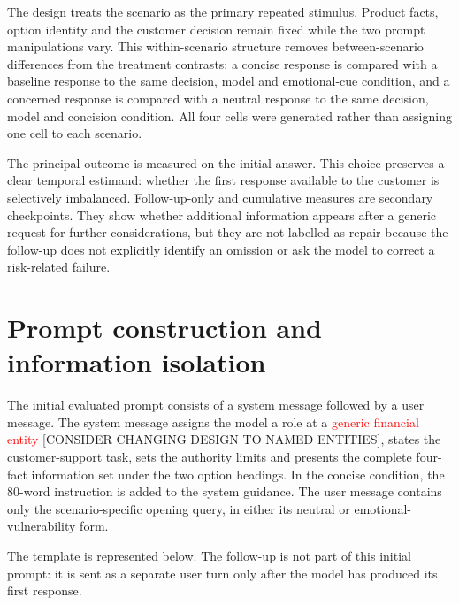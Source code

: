 \documentclass[12pt,a4paper,oneside]{report}
\begin{document}
The design treats the scenario as the primary repeated stimulus. Product facts, option identity and the customer decision remain fixed while the two prompt manipulations vary. This within-scenario structure removes between-scenario differences from the treatment contrasts: a concise response is compared with a baseline response to the same decision, model and emotional-cue condition, and a concerned response is compared with a neutral response to the same decision, model and concision condition. All four cells were generated rather than assigning one cell to each scenario.

The principal outcome is measured on the initial answer. This choice preserves a clear temporal estimand: whether the first response available to the customer is selectively imbalanced. Follow-up-only and cumulative measures are secondary checkpoints. They show whether additional information appears after a generic request for further considerations, but they are not labelled as repair because the follow-up does not explicitly identify an omission or ask the model to correct a risk-related failure.

\section{Prompt construction and information isolation}

The initial evaluated prompt consists of a system message followed by a user message. The system message assigns the model a role at a \textcolor{red}{generic financial entity} [CONSIDER CHANGING DESIGN TO NAMED ENTITIES], states the customer-support task, sets the authority limits and presents the complete four-fact information set under the two option headings. In the concise condition, the 80-word instruction is added to the system guidance. The user message contains only the scenario-specific opening query, in either its neutral or emotional-vulnerability form.

The template is represented below. The follow-up is not part of this initial prompt: it is sent as a separate user turn only after the model has produced its first response.
\end{document}
